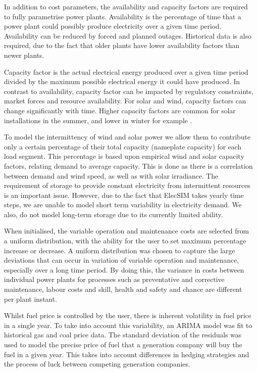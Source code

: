In addition to cost parameters, the availability and capacity factors are required to fully parametrise power plants. Availability is the percentage of time that a power plant could possibly produce electricity over a given time period. Availability can be reduced by forced and planned outages. Historical data is also required, due to the fact that older plants have lower availability factors than newer plants.

Capacity factor is the actual electrical energy produced over a given time period divided by the maximum possible electrical energy it could have produced. In contrast to availability, capacity factor can be impacted by regulatory constraints, market forces and resource availability. For solar and wind, capacity factors can change significantly with time. Higher capacity factors are common for solar installations in the summer, and lower in winter for example \cite{Stoft2002}. 

To model the intermittency of wind and solar power we allow them to contribute only a certain percentage of their total capacity (nameplate capacity) for each load segment. This percentage is based upon empirical wind and solar capacity factors, relating demand to average capacity. This is done as there is a correlation between demand and wind speed, as well as with solar irradiance. The requirement of storage to provide constant electricity from intermittent resources is an important issue. However, due to the fact that ElecSIM takes yearly time steps, we are unable to model short term variability in electricity demand. We also, do not model long-term storage due to its currently limited ability. 

When initialised, the variable operation and maintenance costs are selected from a uniform distribution, with the ability for the user to set maximum percentage increase or decrease. A uniform distribution was chosen to capture the large deviations that can occur in variation of variable operation and maintenance, especially over a long time period. By doing this, the variance in costs between individual power plants for processes such as preventative and corrective maintenance, labour costs and skill, health and safety and chance are different per plant instant.  

Whilst fuel price is controlled by the user, there is inherent volatility in fuel price in a single year. To take into account this variability, an ARIMA model was fit to historical gas and coal price data. The standard deviation of the residuals was used to model the precise price of fuel that a generation company will buy the fuel in a given year. This takes into account differences in hedging strategies and the process of luck between competing generation companies.

